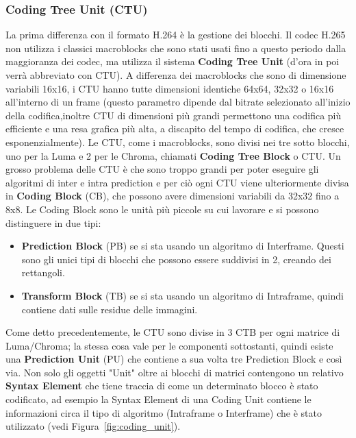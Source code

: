 \documentclass[a4paper,12pt, oneside]{article}
\begin{document}
\subsubsection{Coding Tree Unit (CTU)}
La prima differenza con il formato H.264 è la gestione dei blocchi. Il codec H.265 non utilizza
i classici macroblocks che sono stati usati fino a questo periodo dalla maggioranza dei codec, ma
utilizza il sistema \textbf{Coding Tree Unit} (d'ora in poi verrà abbreviato con CTU). A differenza
dei macroblocks che sono di dimensione variabili 16x16, i CTU hanno tutte dimensioni identiche
64x64, 32x32 o 16x16 all'interno di un frame (questo parametro dipende dal bitrate selezionato all'inizio
della codifica,inoltre CTU di dimensioni più grandi permettono una codifica più efficiente e una resa
grafica più alta, a discapito del tempo di codifica, che cresce esponenzialmente). Le CTU, come i
macroblocks, sono divisi nei tre sotto blocchi, uno per la Luma e 2 per le Chroma, chiamati \textbf{Coding Tree Block} o CTU.
Un grosso problema delle CTU è che sono troppo grandi per poter eseguire gli algoritmi di inter e intra
prediction e per ciò ogni CTU viene ulteriormente divisa in \textbf{Coding Block} (CB), che possono avere
dimensioni variabili da 32x32 fino a 8x8.
Le Coding Block sono le unità più piccole su cui lavorare e si possono distinguere in due tipi:

\begin{itemize}
    \item \textbf{Prediction Block} (PB) se si sta usando un algoritmo di Interframe. Questi sono
    gli unici tipi di blocchi che possono essere suddivisi in 2, creando dei rettangoli.
    \item \textbf{Transform Block} (TB) se si sta usando un algoritmo di Intraframe, quindi contiene
    dati sulle residue delle immagini.
\end{itemize}

Come detto precedentemente, le CTU sono divise in 3 CTB per ogni matrice di Luma/Chroma; la stessa
cosa vale per le componenti sottostanti, quindi esiste una \textbf{Prediction Unit} (PU) che contiene
a sua volta tre Prediction Block e così via. Non solo gli oggetti "Unit" oltre ai blocchi di matrici
contengono un relativo \textbf{Syntax Element} che tiene traccia di come un determinato blocco è
stato codificato, ad esempio la Syntax Element di una Coding Unit contiene le informazioni circa
 il tipo di algoritmo (Intraframe o Interframe) che è stato utilizzato (vedi Figura~\ref{fig:coding_unit}).
 
\end{document}
